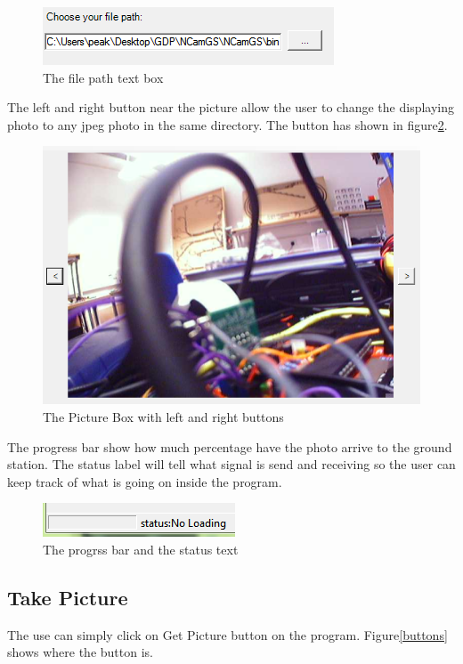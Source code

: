 \documentclass[a4paper,11pt]{article}
\begin{document}
\begin{figure}[!htbp]
\begin{center}
\includegraphics[scale=1]{filePath.PNG} 
\caption{The file path text box\label{filePath}}
\end{center}
\end{figure}

The left and right button near the picture allow the user to change the displaying photo to any jpeg photo in the same directory. The button has shown in figure\ref{leftRight}. 

\begin{figure}[!htbp]
\begin{center}
\includegraphics[scale=1]{leftRight.PNG}   
\caption{The Picture Box with left and right buttons\label{leftRight}}
\end{center}
\end{figure}

The progress bar show how much percentage have the photo arrive to the ground station. The status label will tell what signal is send and receiving so the user can keep track of what is going on inside the program.

\begin{figure}[!htbp]
\begin{center}
\includegraphics[scale=1]{progress_bar.PNG} 
\caption{The progrss bar and the status text\label{progressBar}}
\end{center}
\end{figure}

\subsection*{Take Picture}

The use can simply click on Get Picture button on the program. Figure\ref{buttons} shows where the button is.
\end{document}
